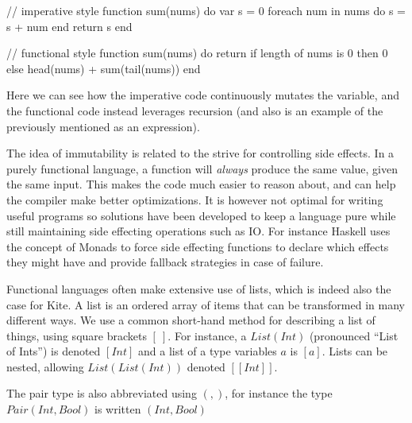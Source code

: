 \begin{pseudo}
// imperative style
function sum(nums) do
  var s = 0
  foreach num in nums do
    s = s + num
  end
  return s
end

// functional style
function sum(nums) do
  return if length of nums is 0
    then 0
    else head(nums) + sum(tail(nums))
end
\end{pseudo}

Here we can see how the imperative code continuously mutates the  variable, and the functional code instead leverages recursion (and also is an example of the previously mentioned  as an expression).

The idea of immutability is related to the strive for controlling side effects. In a purely functional language, a function will \emph{always} produce the same value, given the same input. This makes the code much easier to reason about, and can help the compiler make better optimizations. It is however not optimal for writing useful programs so solutions have been developed to keep a language pure while still maintaining side effecting operations such as IO. For instance Haskell uses the concept of Monads to force side effecting functions to declare which effects they might have and provide fallback strategies in case of failure.

Functional languages often make extensive use of lists, which is indeed also the case for Kite. A list is an ordered array of items that can be transformed in many different ways. We use a common short-hand method for describing a list of things, using square brackets $[\ ]$. For instance, a $List(Int)$ (pronounced ``List of Ints'') is denoted $[Int]$ and a list of a type variables $a$ is $[a]$. Lists can be nested, allowing $List(List(Int))$ denoted $[[Int]]$.

The pair type is also abbreviated using $(,)$, for instance the type $Pair(Int, Bool)$ is written $(Int, Bool)$



